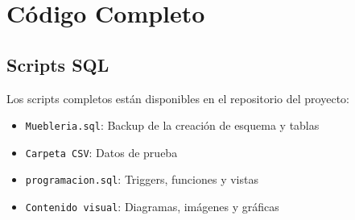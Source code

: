 \documentclass[a4paper, 12pt]{article}
\begin{document}
\appendix
\section{Código Completo}
\subsection{Scripts SQL}

Los scripts completos están disponibles en el repositorio del proyecto:

\begin{itemize}
    \item \texttt{Muebleria.sql}: Backup de la creación de esquema y tablas
    \item \texttt{Carpeta CSV}: Datos de prueba 
    \item \texttt{programacion.sql}: Triggers, funciones y vistas
    \item \texttt{Contenido visual}: Diagramas, imágenes y gráficas
\end{itemize}
\end{document}
